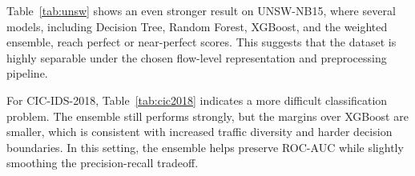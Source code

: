 \documentclass[conference]{IEEEtran}
\begin{document}
Table~\ref{tab:unsw} shows an even stronger result on UNSW-NB15, where several models, including Decision Tree, Random Forest, XGBoost, and the weighted ensemble, reach perfect or near-perfect scores. This suggests that the dataset is highly separable under the chosen flow-level representation and preprocessing pipeline.

\begin{table}[htbp]
\caption{Binary Classification Results on UNSW-NB15.}
\label{tab:unsw}
\centering
{}
\end{table}

For CIC-IDS-2018, Table~\ref{tab:cic2018} indicates a more difficult classification problem. The ensemble still performs strongly, but the margins over XGBoost are smaller, which is consistent with increased traffic diversity and harder decision boundaries. In this setting, the ensemble helps preserve ROC-AUC while slightly smoothing the precision-recall tradeoff.
\end{document}
